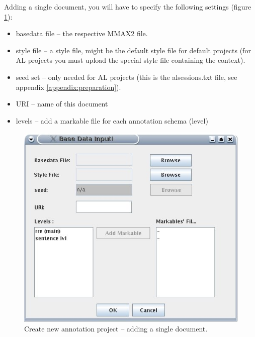 \documentclass[DIV12,english,11pt,halfparskip]{scrartcl}
\begin{document}
Adding a single document, you will have to specify the following
settings (figure \ref{fig:createproject_addsingledoc}):

\begin{itemize}
\item basedata file -- the respective MMAX2 file.
\item style file -- a style file, might be the default style file for
  default projects (for AL projects you must upload the special style
  file containing the context).
\item seed set -- only needed for AL projects (this is the
  alsessions.txt file, see appendix \ref{appendix:preparation}).
\item URI -- name of this document 
\item levels -- add a markable file for each annotation schema (level)
\end{itemize}

\begin{figure}[h]
  \centering
  \includegraphics[scale=0.5]{figs/AddBaseDataDialog.jpg}
  \caption{Create new annotation project -- adding a single document.}
  \label{fig:createproject_addsingledoc}
\end{figure}
\end{document}
